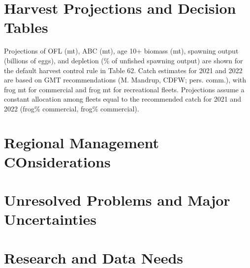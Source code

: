 \documentclass[11pt,
  english,
  a4paper,
]{article}
\begin{document}
\leavevmode\tagmcend\tagstructend


\hypertarget{harvest-projections-and-decision-tables}{%
\section{Harvest Projections and Decision Tables}\label{harvest-projections-and-decision-tables}}

\leavevmode\tagmcend\tagstructend

Projections of OFL (mt), ABC (mt), age 10+ biomass (mt), spawning output (billions of eggs), and depletion (\% of unfished spawning output) are shown for the default harvest control rule in Table 62. Catch estimates for 2021 and 2022 are based on GMT recommendations (M. Mandrup, CDFW; pers. comm.), with frog mt for commercial and frog mt for recreational fleets. Projections assume a constant allocation among fleets equal to the recommended catch for 2021 and 2022 (frog\% commercial, frog\% commercial).


\hypertarget{regional-management-considerations}{%
\section{Regional Management COnsiderations}\label{regional-management-considerations}}

\leavevmode\tagmcend\tagstructend


\hypertarget{unresolved-problems-and-major-uncertainties-2}{%
\section{Unresolved Problems and Major Uncertainties}\label{unresolved-problems-and-major-uncertainties-2}}

\leavevmode\tagmcend\tagstructend


\hypertarget{research-and-data-needs-1}{%
\section{Research and Data Needs}\label{research-and-data-needs-1}}

\leavevmode\tagmcend\tagstructend
\end{document}
